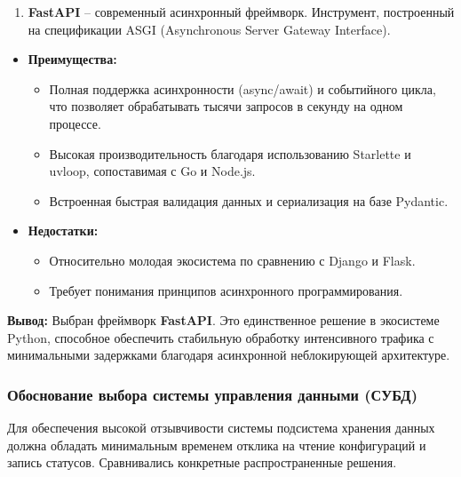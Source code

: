 \documentclass[
]{article}
\begin{document}
\begin{enumerate}
\def\labelenumi{\arabic{enumi}.}
\setcounter{enumi}{2}
\item
  \textbf{FastAPI} -- современный асинхронный фреймворк. Инструмент,
  построенный на спецификации ASGI (Asynchronous Server Gateway
  Interface).
\end{enumerate}

\begin{itemize}
\item
  \textbf{Преимущества:}

  \begin{itemize}
  \item
    Полная поддержка асинхронности (async/await) и событийного цикла,
    что позволяет обрабатывать тысячи запросов в секунду на одном
    процессе.
  \item
    Высокая производительность благодаря использованию Starlette и
    uvloop, сопоставимая с Go и Node.js.
  \item
    Встроенная быстрая валидация данных и сериализация на базе Pydantic.
  \end{itemize}
\item
  \textbf{Недостатки:}

  \begin{itemize}
  \item
    Относительно молодая экосистема по сравнению с Django и Flask.
  \item
    Требует понимания принципов асинхронного программирования.
  \end{itemize}
\end{itemize}

\textbf{Вывод:} Выбран фреймворк \textbf{FastAPI}. Это единственное
решение в экосистеме Python, способное обеспечить стабильную обработку
интенсивного трафика с минимальными задержками благодаря асинхронной
неблокирующей архитектуре.

\subsubsection{Обоснование выбора системы управления данными
(СУБД)}\label{ux43eux431ux43eux441ux43dux43eux432ux430ux43dux438ux435-ux432ux44bux431ux43eux440ux430-ux441ux438ux441ux442ux435ux43cux44b-ux443ux43fux440ux430ux432ux43bux435ux43dux438ux44f-ux434ux430ux43dux43dux44bux43cux438-ux441ux443ux431ux434}

Для обеспечения высокой отзывчивости системы подсистема хранения данных
должна обладать минимальным временем отклика на чтение конфигураций и
запись статусов. Сравнивались конкретные распространенные решения.
\end{document}
